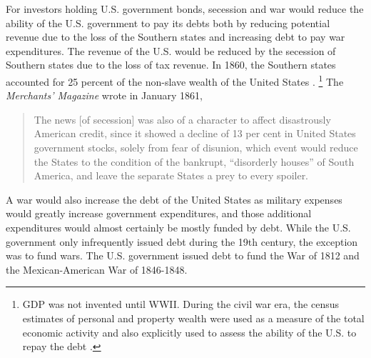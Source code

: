 For investors holding U.S. government bonds, secession and war would reduce the ability of the U.S. government to pay its debts both by reducing potential revenue due to the loss of the Southern states and increasing debt to pay war expenditures.
The revenue of the U.S. would be reduced by the secession of Southern states due to the loss of tax revenue. In 1860, the Southern states accounted for 25 percent of the non-slave wealth of the United States \parencite[11]{Elder1865}.%
\footnote{GDP was not invented until WWII.
  During the civil war era, the census estimates of personal and property wealth were used as a measure of the total economic activity and also explicitly used to assess the ability of the U.S. to repay the debt \parencites{Elder1863}{Elder1865}.
}
The \textit{Merchants' Magazine} wrote in January 1861,
\begin{quote}
   The news [of secession] was also of a character to affect disastrously American credit, since it showed a decline of 13 per cent in United States government stocks, solely from fear of disunion, which event would reduce the States to the condition of the bankrupt, ``disorderly houses'' of South America, and leave the separate States a prey to every spoiler. \parencite[79]{HomansDana1861a}
\end{quote}
A war would also increase the debt of the United States as military expenses would greatly increase government expenditures, and those additional expenditures would almost certainly be mostly funded by debt.
While the U.S. government only infrequently issued debt during the 19th century, the exception was to fund wars.
The U.S. government issued debt to fund the War of 1812 and the Mexican-American War of 1846-1848.
